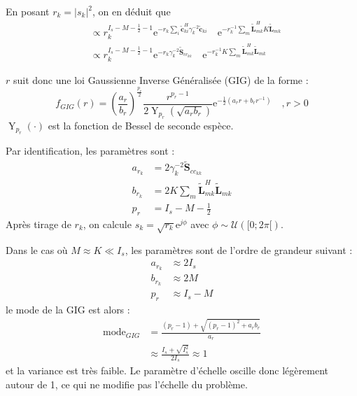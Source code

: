 \documentclass[ 12pt]{article}
\newcommand{\e}{\mathrm{e}}
\newcommand{\tr}[1]{\operatorname{Trace}\!\left(#1\right)}
\begin{document}
En posant $r_k=|s_k|^2$, on en déduit que 
\begin{align*}
	[r_k|\infty] & \propto r_k^{I_s -M -\frac{1}{2} -1} \e^{-r_k\sum_i \bm{\tilde{c}}_{ki}^H \gamma_k^{-2}\bm{\tilde{c}}_{ki}} \quad
	 \e^{-r_k^{-1}\sum_m \bm{\tilde{L}}_{mk}^H K \bm{\tilde{L}}_{mk}}\\
	 & \propto r_k^{I_s -M -\frac{1}{2} -1}  \e^{-r_k  \gamma_k^{-2} \bm{\tilde{S}}_{{cc}_{kk}}} \quad
	 	\e^{-r_k^{-1}K \sum_m \bm{\tilde{L}}_{mk}^H \bm{\tilde{L}}_{mk}}
\end{align*}

$r$ suit donc une loi Gaussienne Inverse Généralisée (GIG)  de la forme : 
\begin{equation*}
	    f_{GIG}(r) = \left(\frac{a_r}{b_r}\right)^{\frac{p_r}{2}}  \frac{r^{p_r-1}}{2 \operatorname{Y}_{p_r}\!\left( \sqrt{a_rb_r}\right)} \e^{-\frac{1}{2} ( a_r r + b_r r^{-1} )} \quad, r>0
\end{equation*}
$ \operatorname{Y}_{p_r} (\cdot)$ est la fonction de Bessel de seconde espèce.

Par identification, les paramètres sont : 
\begin{align*}
	a_{r_k} & = 2 \gamma_k^{-2}\bm{\tilde{S}}_{{cc}_{kk}}\\
	b_{r_k} &= 2K \sum_m \bm{\tilde{L}}_{mk}^H \bm{\tilde{L}}_{mk}\\
	p_r &= I_s- M - \frac{1}{2}
\end{align*}
Après tirage de $r_k$, on calcule $s_k=\sqrt{r_k} \e^{j\phi}$ avec $\phi \sim \mathcal{U}([0;2\pi[)$.

Dans le cas où $M\approx K \ll I_s$, les paramètres sont de l'ordre de grandeur suivant :
\begin{align*}
	a_{r_k} &\approx 2 I_s\\
	b_{r_k} &\approx 2M\\
	p_r &\approx  I_s-M
\end{align*}
le mode de la GIG est alors :
\begin{align*}
	\mathrm{mode}_{GIG} & = \frac{(p_r -1) + \sqrt{(p_r-1)^2 + a_rb_r}}{a_r}\\
	& \approx \frac{I_s + \sqrt{I_s^2}}{2I_s} \approx 1
\end{align*}
et la variance est très faible.
Le paramètre d'échelle oscille donc légèrement autour de 1, ce qui ne modifie pas l'échelle du problème.\\
\end{document}
